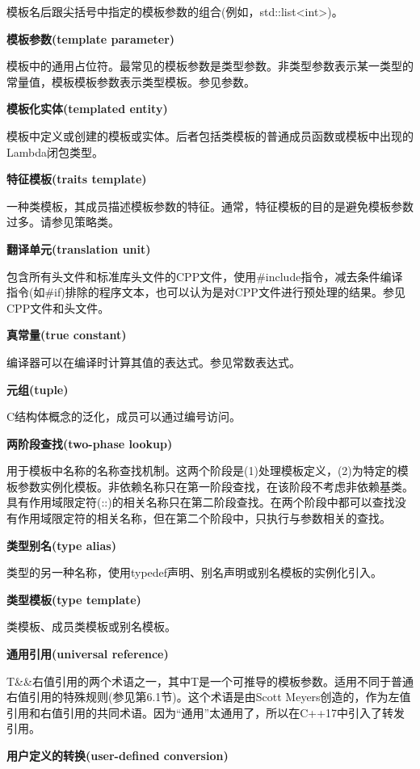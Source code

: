 模板名后跟尖括号中指定的模板参数的组合(例如，std::list<int>)。

\noindent
\textbf{模板参数(template parameter)}

模板中的通用占位符。最常见的模板参数是类型参数。非类型参数表示某一类型的常量值，模板模板参数表示类型模板。参见参数。

\noindent
\textbf{模板化实体(templated entity)}

模板中定义或创建的模板或实体。后者包括类模板的普通成员函数或模板中出现的Lambda闭包类型。

\noindent
\textbf{特征模板(traits template)}

一种类模板，其成员描述模板参数的特征。通常，特征模板的目的是避免模板参数过多。请参见策略类。

\noindent
\textbf{翻译单元(translation unit)}

包含所有头文件和标准库头文件的CPP文件，使用\#include指令，减去条件编译指令(如\#if)排除的程序文本，也可以认为是对CPP文件进行预处理的结果。参见CPP文件和头文件。

\noindent
\textbf{真常量(true constant)}

编译器可以在编译时计算其值的表达式。参见常数表达式。

\noindent
\textbf{元组(tuple)}

C结构体概念的泛化，成员可以通过编号访问。

\noindent
\textbf{两阶段查找(two-phase lookup)}

用于模板中名称的名称查找机制。这两个阶段是(1)处理模板定义，(2)为特定的模板参数实例化模板。非依赖名称只在第一阶段查找，在该阶段不考虑非依赖基类。具有作用域限定符(::)的相关名称只在第二阶段查找。在两个阶段中都可以查找没有作用域限定符的相关名称，但在第二个阶段中，只执行与参数相关的查找。

\noindent
\textbf{类型别名(type alias)}

类型的另一种名称，使用typedef声明、别名声明或别名模板的实例化引入。

\noindent
\textbf{类型模板(type template)}

类模板、成员类模板或别名模板。

\noindent
\textbf{通用引用(universal reference)}

T\&\&右值引用的两个术语之一，其中T是一个可推导的模板参数。适用不同于普通右值引用的特殊规则(参见第6.1节)。这个术语是由Scott Meyers创造的，作为左值引用和右值引用的共同术语。因为“通用”太通用了，所以在C++17中引入了转发引用。

\noindent
\textbf{用户定义的转换(user-defined conversion)}

